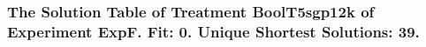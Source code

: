  \begin{frame}
 \fontsize{8pt}{9pt}\selectfont
 \frametitle{ The Solution Table of Treatment BoolT5sgp12k of Experiment ExpF. Fit: 0. Unique Shortest Solutions: 39. }

 \label{ExpFSolutionTable010.tex}  
 \end{frame}

